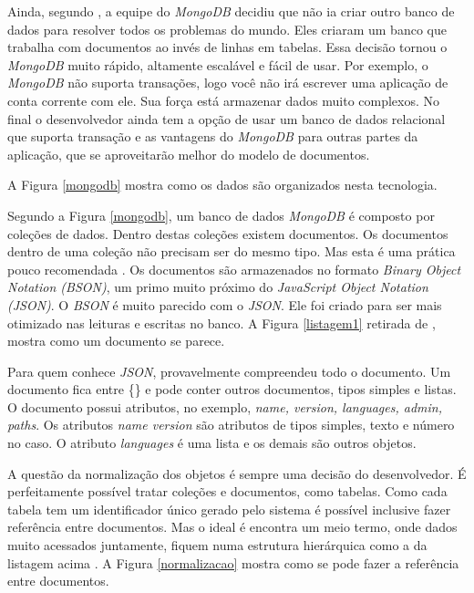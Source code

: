 Ainda, segundo , a equipe do \emph{MongoDB} decidiu que não ia criar outro banco de dados para resolver todos os problemas do mundo. Eles criaram um banco que trabalha com documentos ao invés de linhas em tabelas. Essa decisão tornou o \emph{MongoDB} muito rápido, altamente escalável e fácil de usar. Por exemplo, o \emph{MongoDB} não suporta transações, logo você não irá escrever uma aplicação de conta corrente com ele. Sua força está armazenar dados muito complexos. No final o desenvolvedor ainda tem a opção de usar um banco de dados relacional que suporta transação e as vantagens do \emph{MongoDB} para outras partes da aplicação, que se aproveitarão melhor do modelo de documentos.


A Figura \ref{mongodb} mostra como os dados são organizados nesta tecnologia.

Segundo a Figura \ref{mongodb}, um banco de dados \emph{MongoDB} é composto por coleções de dados. 
Dentro destas coleções existem documentos. 
Os documentos dentro de uma coleção não precisam ser do mesmo tipo. 
Mas esta é uma prática pouco recomendada \cite{Plugge2014}. 
Os documentos são armazenados no formato \emph{Binary Object Notation (BSON)}, um primo muito próximo do \emph{JavaScript Object Notation (JSON)}. 
O \emph{BSON} é muito parecido com o \emph{JSON}. Ele foi criado para ser mais otimizado nas leituras e escritas no banco. A Figura \ref{listagem1} retirada de , mostra como um documento se parece.

Para quem conhece \emph{JSON}, provavelmente compreendeu todo o documento. Um documento fica entre \{\} e pode conter outros documentos, tipos simples e listas.
O documento possui atributos, no exemplo, \emph{name, version, languages, admin, paths}. Os atributos \emph{name version} são atributos de tipos simples, texto e número no caso. O atributo \emph{languages} é uma lista e os demais são outros objetos.

A questão da normalização dos objetos é sempre uma decisão do desenvolvedor. É perfeitamente possível tratar coleções e documentos, como tabelas. Como cada tabela tem um identificador único gerado pelo sistema é possível inclusive fazer referência entre documentos. Mas o ideal é encontra um meio termo, onde dados muito acessados juntamente, fiquem numa estrutura hierárquica como a da listagem acima \cite{Dayley2014}. A Figura \ref{normalizacao} mostra como se pode fazer a referência entre documentos.

